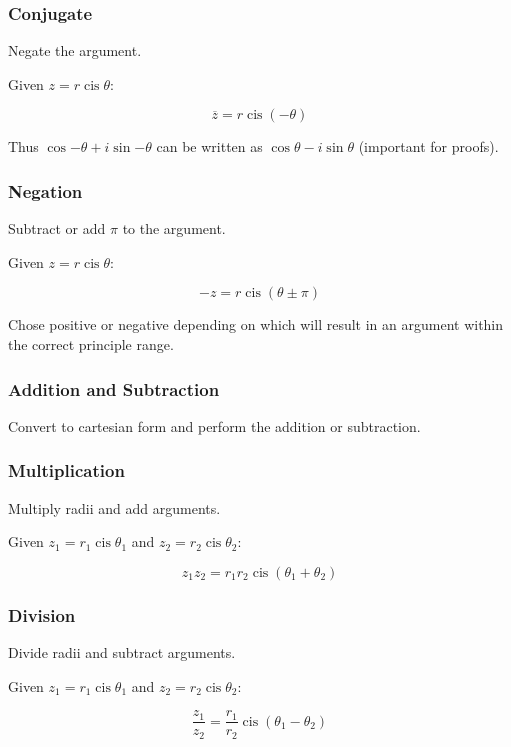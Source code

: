 \documentclass[a4paper,11pt]{article}
\DeclareMathOperator\cis{cis}
\begin{document}
\subsubsection{Conjugate}

Negate the argument.

Given $z = r \cis{\theta}$:

$$
\overline{z} = r \cis(-\theta)
$$

Thus $\cos{-\theta} + i\sin{-\theta}$ can be written as
$\cos{\theta} - i\sin{\theta}$ (important for proofs).


\subsubsection{Negation}

Subtract or add $\pi$ to the argument.

Given $z = r \cis{\theta}$:

$$
-z = r \cis(\theta \pm \pi)
$$

Chose positive or negative depending on which will result in an argument within
the correct principle range.


\subsubsection{Addition and Subtraction}

Convert to cartesian form and perform the addition or subtraction.


\subsubsection{Multiplication}

Multiply radii and add arguments.

Given $z_1 = r_1 \cis{\theta_1}$ and $z_2 = r_2 \cis{\theta_2}$:

$$
z_1 z_2 = r_1 r_2 \cis(\theta_1 + \theta_2)
$$


\subsubsection{Division}

Divide radii and subtract arguments.

Given $z_1 = r_1 \cis{\theta_1}$ and $z_2 = r_2 \cis{\theta_2}$:

$$
\frac{z_1}{z_2} = \frac{r_1}{r_2} \cis(\theta_1 - \theta_2)
$$
\end{document}

